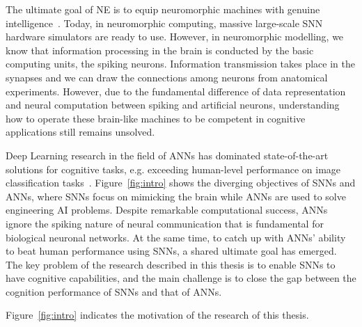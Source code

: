 The ultimate goal of NE is to equip neuromorphic machines with genuine intelligence~\citep{konar1999artificial}.
Today, in neuromorphic computing, massive large-scale SNN hardware simulators are ready to use.
However, in neuromorphic modelling, we know that information processing in the brain is conducted by the basic computing units, the spiking neurons.
Information transmission takes place in the synapses and we can draw the connections among neurons from anatomical experiments.
However, due to the fundamental difference of data representation and neural computation between spiking and artificial neurons, understanding how to operate these brain-like machines to be competent in cognitive applications still remains unsolved.

Deep Learning research in the field of ANNs has dominated state-of-the-art solutions for cognitive tasks, e.g. exceeding human-level performance on image classification tasks~\citep{he2015delving}.
Figure~\ref{fig:intro} shows the diverging objectives of SNNs and ANNs, where SNNs focus on mimicking the brain while ANNs are used to solve engineering AI problems.
Despite remarkable computational success, ANNs ignore the spiking nature of neural communication that is fundamental for biological neuronal networks.
At the same time, to catch up with ANNs' ability to beat human performance using SNNs, a shared ultimate goal has emerged.
The key problem of the research described in this thesis is to enable SNNs to have cognitive capabilities, and the main challenge is to close the gap between the cognition performance of SNNs and that of ANNs.

Figure~\ref{fig:intro} indicates the motivation of the research of this thesis.

